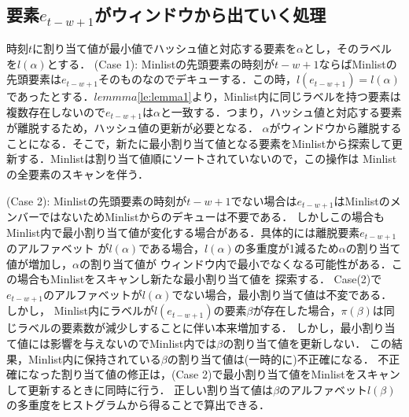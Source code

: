 \subsection{要素$e_{t-w+1}$がウィンドウから出ていく処理}
時刻$t$に割り当て値が最小値でハッシュ値と対応する要素を$\alpha$とし，そのラベルを$l(\alpha)$とする．
\noindent (Case 1): Minlistの先頭要素の時刻が$t-w+1$ならばMinlistの先頭要素は$e_{t-w+1}$そのものなのでデキューする．この時，$l(e_{t-w+1}) = l(\alpha)$であったとする．$lemmma$\ref{le:lemma1}より，Minlist内に同じラベルを持つ要素は複数存在しないので$e_{t-w+1}$は$\alpha$と一致する．つまり，ハッシュ値と対応する要素が離脱するため，ハッシュ値の更新が必要となる．
$\alpha$がウィンドウから離脱することになる．そこで，新たに最小割り当て値となる要素をMinlistから探索して更新する．Minlistは割り当て値順にソートされていないので，この操作は
Minlistの全要素のスキャンを伴う．

\noindent (Case 2): Minlistの先頭要素の時刻が$t-w+1$でない場合は$e_{t-w+1}$はMinlistのメンバーではないためMinlistからのデキューは不要である．
しかしこの場合もMinlist内で最小割り当て値が変化する場合がある．具体的には離脱要素$e_{t-w+1}$のアルファベット
が$l({\alpha})$である場合，$l(\alpha)$の多重度が1減るため$\alpha$の割り当て値が増加し，$\alpha$の割り当て値が
ウィンドウ内で最小でなくなる可能性がある．この場合もMinlistをスキャンし新たな最小割り当て値を
探索する．
Case(2)で$e_{t-w+1}$のアルファベットが$l(\alpha)$でない場合，最小割り当て値は不変である．しかし，
Minlist内にラベルが$l(e_{t-w+1})$の要素$\beta$が存在した場合，$\pi(\beta)$は同じラベルの要素数が減少しすることに伴い本来増加する．
しかし，最小割り当て値には影響を与えないのでMinlist内では$\beta$の割り当て値を更新しない．
この結果，Minlist内に保持されている$\beta$の割り当て値は(一時的に)不正確になる．
不正確になった割り当て値の修正は，(Case 2)で最小割り当て値をMinlistをスキャンして更新するときに同時に行う．
正しい割り当て値は$\beta$のアルファベット$l(\beta)$の多重度をヒストグラムから得ることで算出できる．
%
